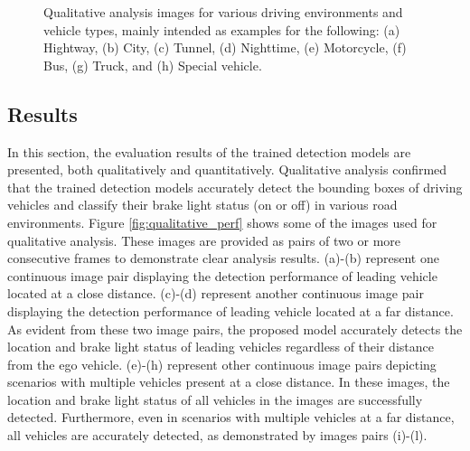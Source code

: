 \begin{figure}[t!]%

    \hfill

\caption{Qualitative analysis images for various driving environments and vehicle types, mainly intended as examples for the following: (a) Hightway, (b) City, (c) Tunnel, (d) Nighttime, (e) Motorcycle, (f) Bus, (g) Truck, and (h) Special vehicle.
}
\label{fig:qualitative_env}%
\end{figure}




\subsection{Results}
\label{sec:exp_results}
In this section, the evaluation results of the trained detection models are presented, both qualitatively and quantitatively.
Qualitative analysis confirmed that the trained detection models accurately detect the bounding boxes of driving vehicles and classify their brake light status (on or off) in various road environments.
Figure \ref{fig:qualitative_perf} shows some of the images used for qualitative analysis.
These images are provided as pairs of two or more consecutive frames to demonstrate clear analysis results.
(a)-(b) represent one continuous image pair displaying the detection performance of leading vehicle located at a close distance.
(c)-(d) represent another continuous image pair displaying the detection performance of leading vehicle located at a far distance.
As evident from these two image pairs, the proposed model accurately detects the location and brake light status of leading vehicles regardless of their distance from the ego vehicle.
(e)-(h) represent other continuous image pairs depicting scenarios with multiple vehicles present at a close distance.
In these images, the location and brake light status of all vehicles in the images are successfully detected.
Furthermore, even in scenarios with multiple vehicles at a far distance, all vehicles are accurately detected, as demonstrated by images pairs (i)-(l).

